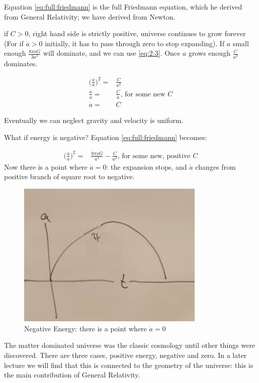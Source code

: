 \documentclass[]{article}
\begin{document}
Equation \eqref{eq:full:friedmann} is the full Friedmann equation, which he derived from General Relativity; we have derived from Newton.

if $C>0$, right hand side is strictly positive, universe continues to grow forever (For if $\dot{a}>0$ initially, it has to pass through zero to stop expanding). If $a$ small enough $\frac{8\pi\nu G}{3 a^3}$ will dominate, and we can use \eqref{eq:2:3}. Once $a$ grows enough $ \frac{C}{a^2}$ dominates.

\begin{align*}
	\big(\frac{\dot{a}}{a}\big)^2  =&  \frac{C}{a^2} \\
	\frac{\dot{a}}{a} =&  \frac{C}{a} \text{, for some new $C$}\\
	\dot{a} =& C
\end{align*}

Eventually we can neglect gravity and velocity is uniform.

What if energy is negative? Equation \eqref{eq:full:friedmann} becomes:

\begin{align*}
	\big(\frac{\dot{a}}{a}\big)^2  =& \frac{8\pi\nu G}{a^3} - \frac{C}{a^2} \text{, for some new, positive $C$}
\end{align*}
Now there is a point where $\dot{a}=0$: the expansion stops, and $\dot{a}$ changes from positive branch of square root to negative.

\begin{figure}[H]
	\caption{Negative Energy:  there is a point where $\dot{a}=0$}
	\includegraphics[width=0.8\textwidth]{cosmo-2-negative}
\end{figure}

The matter dominated universe was the classic cosmology until other things were discovered. There are three cases, positive energy, negative and zero. In a later lecture we will find that this is connected to the geometry of the universe: this is the main contribution of General Relativity.
\end{document}

